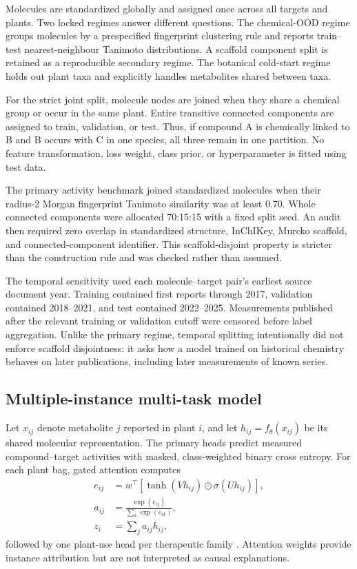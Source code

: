 \documentclass[11pt]{article}
\begin{document}
Molecules are standardized globally and assigned once across all targets and
plants. Two locked regimes answer different questions. The chemical-OOD regime
groups molecules by a prespecified fingerprint clustering rule and reports
train--test nearest-neighbour Tanimoto distributions. A scaffold component split
is retained as a reproducible secondary regime. The botanical cold-start regime
holds out plant taxa and explicitly handles metabolites shared between taxa.

For the strict joint split, molecule nodes are joined when they share a chemical
group or occur in the same plant. Entire transitive connected components are
assigned to train, validation, or test. Thus, if compound A is chemically linked
to B and B occurs with C in one species, all three remain in one partition. No
feature transformation, loss weight, class prior, or hyperparameter is fitted
using test data.

The primary activity benchmark joined standardized molecules when their
radius-2 Morgan fingerprint Tanimoto similarity was at least 0.70. Whole
connected components were allocated 70:15:15 with a fixed split seed. An audit
then required zero overlap in standardized structure, InChIKey, Murcko scaffold,
and connected-component identifier. This scaffold-disjoint property is stricter
than the construction rule and was checked rather than assumed.

The temporal sensitivity used each molecule--target pair's earliest source
document year. Training contained first reports through 2017, validation
contained 2018--2021, and test contained 2022--2025. Measurements published
after the relevant training or validation cutoff were censored before label
aggregation. Unlike the primary regime, temporal splitting intentionally did
not enforce scaffold disjointness: it asks how a model trained on historical
chemistry behaves on later publications, including later measurements of known
series.

\subsection{Multiple-instance multi-task model}

Let $x_{ij}$ denote metabolite $j$ reported in plant $i$, and let
$h_{ij}=f_\theta(x_{ij})$ be its shared molecular representation. The primary
heads predict measured compound--target activities with masked, class-weighted
binary cross entropy. For each plant bag, gated attention computes
\begin{align}
e_{ij} &= w^\top\left[\tanh(Vh_{ij}) \odot \sigma(Uh_{ij})\right],\\
a_{ij} &= \frac{\exp(e_{ij})}{\sum_k \exp(e_{ik})},\\
z_i &= \sum_j a_{ij}h_{ij},
\end{align}
followed by one plant-use head per therapeutic family
\citep{ilse2018attention}. Attention weights provide instance attribution but
are not interpreted as causal explanations.
\end{document}
